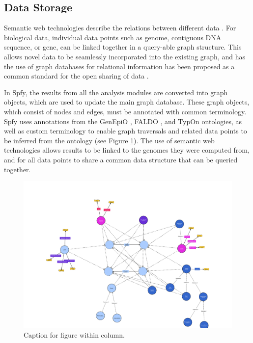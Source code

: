 \documentclass[a4,center,fleqn]{NAR}
\begin{document}
\subsection{Data Storage}
Semantic web technologies describe the relations between different data \citep{berners2001semantic}. For biological data, individual data points such as genome, contiguous DNA sequence, or gene, can be linked together in a query-able graph structure. This allows novel data to be seamlessly incorporated into the existing graph, and has the use of graph databases for relational information has been proposed as a common standard for the open sharing of data \citep{horrocks2005semantic}.

In Spfy, the results from all the analysis modules are converted into graph objects, which are used to update the main graph database. These graph objects, which consist of nodes and edges, must be annotated with common terminology. Spfy uses annotations from the GenEpiO \citep{griffiths2017context}, FALDO \citep{bolleman2016faldo}, and TypOn \citep{vaz2014typon} ontologies, as well as custom terminology to enable graph traversals and related data points to be inferred from the ontology (see Figure \ref{fig-ontology}). The use of semantic web technologies allows results to be linked to the genomes they were computed from, and for all data points to share a common data structure that can be queried together.

\begin{figure}[t]
\begin{center}
\includegraphics{images/spfy_ontology-1.svg}
\end{center}
\caption{Caption for figure within column.}
\label{fig-ontology}
\end{figure}
\end{document}
